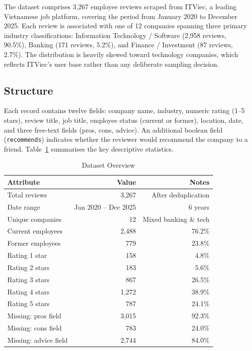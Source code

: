 \documentclass[12pt, a4paper]{article}
\begin{document}
The dataset comprises 3,267 employee reviews scraped from ITViec, a leading Vietnamese job platform, covering the period from January 2020 to December 2025. Each review is associated with one of 12 companies spanning three primary industry classifications: Information Technology / Software (2,958 reviews, 90.5\%), Banking (171 reviews, 5.2\%), and Finance / Investment (87 reviews, 2.7\%). The distribution is heavily skewed toward technology companies, which reflects ITViec's user base rather than any deliberate sampling decision.

\subsection{Structure}

Each record contains twelve fields: company name, industry, numeric rating (1--5 stars), review title, job title, employee status (current or former), location, date, and three free-text fields (pros, cons, advice). An additional boolean field (\texttt{recommends}) indicates whether the reviewer would recommend the company to a friend. Table~\ref{tab:dataset_overview} summarises the key descriptive statistics.

\begin{table}[H]
\centering
\caption{Dataset Overview}
\label{tab:dataset_overview}
\begin{tabular}{lrr}
\toprule
\textbf{Attribute} & \textbf{Value} & \textbf{Notes} \\
\midrule
Total reviews & 3,267 & After deduplication \\
Date range & Jan 2020 -- Dec 2025 & 6 years \\
Unique companies & 12 & Mixed banking \& tech \\
Current employees & 2,488 & 76.2\% \\
Former employees & 779 & 23.8\% \\
\midrule
Rating 1 star & 158 & 4.8\% \\
Rating 2 stars & 183 & 5.6\% \\
Rating 3 stars & 867 & 26.5\% \\
Rating 4 stars & 1,272 & 38.9\% \\
Rating 5 stars & 787 & 24.1\% \\
\midrule
Missing: pros field & 3,015 & 92.3\% \\
Missing: cons field & 783 & 24.0\% \\
Missing: advice field & 2,744 & 84.0\% \\
\bottomrule
\end{tabular}
\end{table}
\end{document}
